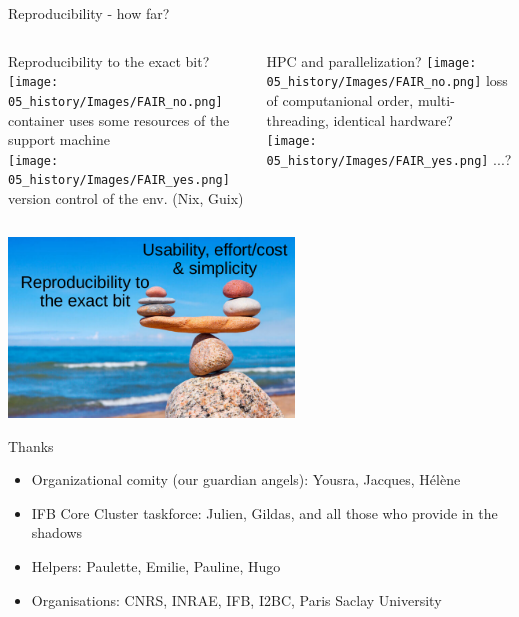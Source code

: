 
\begin{frame}{Reproducibility - how far?}
\begin{columns}
\begin{block}{Reproducibility to the exact bit?}
\texttt{[image: 05\_history/Images/FAIR\_no.png]} container uses some resources of the support machine\\
\texttt{[image: 05\_history/Images/FAIR\_yes.png]} version control of the env. (Nix, Guix)
\end{block}

\begin{block}{HPC and parallelization?}
 \texttt{[image: 05\_history/Images/FAIR\_no.png]} loss of computanional order, multi-threading, identical hardware?\\
 \texttt{[image: 05\_history/Images/FAIR\_yes.png]} ...?
\end{block}
\end{columns}
\begin{center}
    \includegraphics[height=4.8cm]{shared/FAIR_equilibre.png}
\end{center}
\end{frame}
\begin{frame}{Thanks}
\begin{itemize}
    \item Organizational comity (our guardian angels): Yousra, Jacques, Hélène
    \item IFB Core Cluster taskforce: Julien, Gildas, and all those who provide in the shadows
    \item Helpers: Paulette, Emilie, Pauline, Hugo
    \item Organisations: CNRS, INRAE, IFB, I2BC, Paris Saclay University
\end{itemize}
\end{frame}
